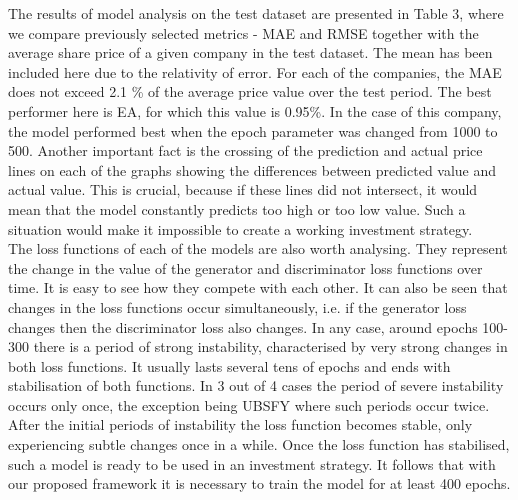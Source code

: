 \documentclass[11pt]{article} %
\begin{document}
The results of model analysis on the test dataset are presented in Table 3, where we compare previously selected metrics - MAE and RMSE together with the average share price of a given company in the test dataset. The mean has been included here due to the relativity of error.  For each of the companies, the MAE does not exceed 2.1 \% of the average price value over the test period. The best performer here is EA, for which this value is 0.95\%.  In the case of this company, the model performed best when the epoch parameter was changed from 1000 to 500. Another important fact is the crossing of the prediction and actual price lines on each of the graphs showing the differences between predicted value and actual value. This is crucial, because if these lines did not intersect, it would mean that the model constantly predicts too high or too low value. Such a situation would make it impossible to create a working investment strategy. \\

The loss functions of each of the models are also worth analysing. They represent the change in the value of the generator and discriminator loss functions over time. It is easy to see how they compete with each other. It can also be seen that changes in the loss functions occur simultaneously, i.e. if the generator loss changes then the discriminator loss also changes. In any case, around epochs 100-300 there is a period of strong instability, characterised by very strong changes in both loss functions. It usually lasts several tens of epochs and ends with stabilisation of both functions. In 3 out of 4 cases the period of severe instability occurs only once, the exception being UBSFY where such periods occur twice. After the initial periods of instability the loss function becomes stable, only experiencing subtle changes once in a while. Once the loss function has stabilised, such a model is ready to be used in an investment strategy. It follows that with our proposed framework it is necessary to train the model for at least 400 epochs. 
\end{document}
